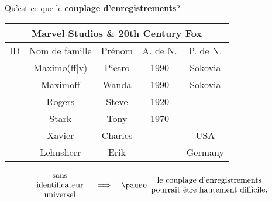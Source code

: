 \begin{frame}{\Large Qu'est-ce que le \textbf{couplage d'enregistrements}?}
\scriptsize
\begin{center}
\vskip -0.1cm
\begin{tabular}{|c|c|c||c|c|}
\hline
	\multicolumn{5}{|c|}{Marvel Studios \;\; \& \;\; 20th Century Fox} \\
\hline
	ID & Nom de famille & Pr\'enom & A. de N. & P. de N. \\
\hline
	\rowcolor{lightGray}
	\cellcolor{white} & Maximo{\color{red}(ff|v)} & Pietro & 1990 & Sokovia \\
\hline
	\rowcolor{lightGray}
	\cellcolor{white} & Maximo{\color{red}ff} & Wanda & 1990 & Sokovia \\
\hline
	\rowcolor{bgOrange}
	\cellcolor{white} & Rogers & Steve & 1920 & \\
\hline
	\rowcolor{bgOrange}
	\cellcolor{white} & Stark & Tony & 1970 & \\
\hline
	\rowcolor{lightTurquoise}
	\cellcolor{white} & Xavier & Charles & & USA \\
\hline
	\rowcolor{lightTurquoise}
	\cellcolor{white} & Lehnsherr & Erik & & Germany \\
\hline
\end{tabular}
\end{center}

\vskip -0.1cm

\large
\begin{equation*}
\begin{array}{c}
	\textnormal{sans} \\
	\textnormal{identificateur} \\
	\textnormal{universel}
\end{array}
\quad
\Longrightarrow
\quad
\pause
\begin{array}{c}
	\textnormal{le couplage d'enregistrements} \\
	\textnormal{pourrait \^etre hautement difficile.}
\end{array}
\end{equation*}

\end{frame}
\normalsize

